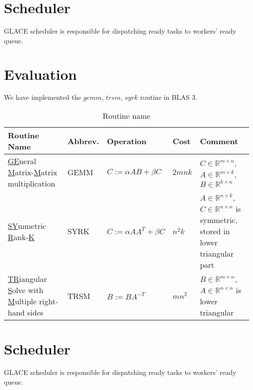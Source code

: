 \documentclass[preprint,11pt]{elsarticle}
\begin{document}
\section{Scheduler}
  GLACE scheduler is responsible for dispatching ready tasks to workers' ready queue. 




 



\section{Evaluation}

We have implemented the $gemm$, $trsm$, $syrk$ routine in BLAS 3.\\

\begin{table}
  \centering
  {\footnotesize 
  \begin{tabular}{l|l|l|l|l}
    \hline
	Routine Name    & Abbrev. & Operation & Cost & Comment\\
	\hline
	\underline{GE}neral \underline{M}atrix-\underline{M}atrix multiplication & GEMM & $C:=\alpha AB+\beta C$ & $2mnk$ & $C \in \mathbb{R}^{m \times n}$, $A \in \mathbb{R}^{m \times k}$, $B \in \mathbb{R}^{k \times n}$  \\
	\hline
    \underline{SY}mmetric \underline{R}ank-\underline{K} & SYRK &  $C:=\alpha AA^{T}+\beta C$ & $n^2k$ & $A \in \mathbb{R}^{n \times k}$, $C \in \mathbb{R}^{n \times n}$ is symmetric, stored in lower triangular part\\
    \hline
	\underline{TR}iangular \underline{S}olve with \underline{M}ultiple right-hand sides & TRSM &  $B:=BA^{-T}$ & $mn^2$ & $B \in \mathbb{R}^{m \times n}$, $A \in \mathbb{R}^{n \times n}$ is lower triangular\\
	\hline
  \end{tabular}
}
\caption{Routine name}
  \label{tab:notation}
\end{table}





\section{Scheduler}
  GLACE scheduler is responsible for dispatching ready tasks to workers' ready queue. 
\end{document}
